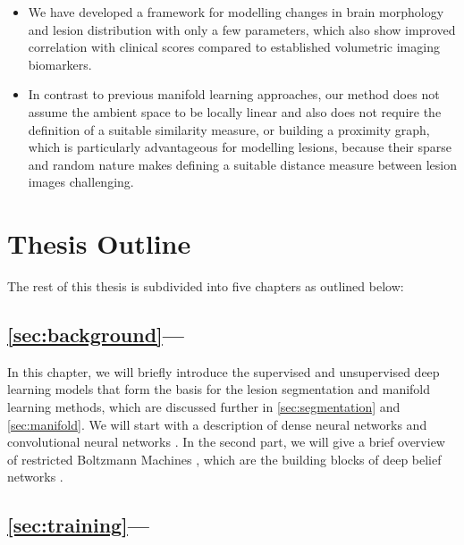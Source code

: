 \begin{itemize}
\item We have developed a framework for modelling changes in brain morphology
and lesion distribution with only a few parameters, which also show improved
correlation with clinical scores compared to established volumetric imaging
biomarkers.

\item In contrast to previous manifold learning approaches, our method does not
assume the ambient space to be locally linear and also does not require the
definition of a suitable similarity measure, or building a proximity graph,
which is particularly advantageous for modelling lesions, because their sparse
and random nature makes defining a suitable distance measure between lesion
images challenging.
\end{itemize}

\section[Thesis outline]{Thesis Outline}

The rest of this thesis is subdivided into five chapters as outlined below:

\subsection*{\ref{sec:background}---}

In this chapter, we will briefly introduce the supervised and unsupervised deep
learning models that form the basis for the lesion segmentation and manifold
learning methods, which are discussed further in \ref{sec:segmentation}
and \ref{sec:manifold}. We will start with a description of dense neural
networks \citep{farley1954,werbos1974,rumelhart1986} and convolutional
neural networks \citep{fukushima1980,lecun1989,lecun1998}. In the second
part, we will give a brief overview of restricted Boltzmann Machines
\citep{freund1992,hinton2010a}, which are the building blocks of deep belief
networks \citep{hinton2006b}.

\subsection*{\ref{sec:training}---}

